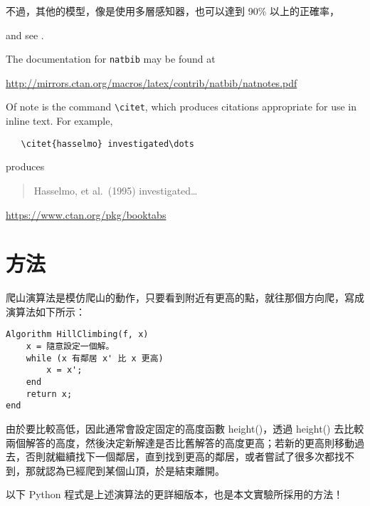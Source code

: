 \documentclass{article}
\begin{document}
不過，其他的模型，像是使用多層感知器，也可以達到 90\% 以上的正確率，


 \cite{kour2014real,kour2014fast} and see \cite{hadash2018estimate}.

The documentation for \verb+natbib+ may be found at
\begin{center}
  \url{http://mirrors.ctan.org/macros/latex/contrib/natbib/natnotes.pdf}
\end{center}
Of note is the command \verb+\citet+, which produces citations
appropriate for use in inline text.  For example,
\begin{verbatim}
   \citet{hasselmo} investigated\dots
\end{verbatim}
produces
\begin{quote}
  Hasselmo, et al.\ (1995) investigated\dots
\end{quote}

\begin{center}
  \url{https://www.ctan.org/pkg/booktabs}
\end{center}


\section{方法}

爬山演算法是模仿爬山的動作，只要看到附近有更高的點，就往那個方向爬，寫成演算法如下所示：

\begin{minipage}{\linewidth}
\begin{verbatim}
Algorithm HillClimbing(f, x)
    x = 隨意設定一個解。
    while (x 有鄰居 x' 比 x 更高)
        x = x';
    end
    return x;
end
\end{verbatim}
\end{minipage}

由於要比較高低，因此通常會設定固定的高度函數 height()，透過 height() 去比較兩個解答的高度，然後決定新解達是否比舊解答的高度更高；若新的更高則移動過去，否則就繼續找下一個鄰居，直到找到更高的鄰居，或者嘗試了很多次都找不到，那就認為已經爬到某個山頂，於是結束離開。

以下 Python 程式是上述演算法的更詳細版本，也是本文實驗所採用的方法！
\end{document}
